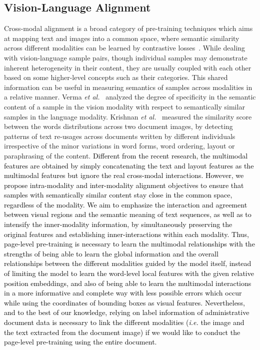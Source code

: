 \documentclass[preprint,review,12pt]{elsarticle}
\newcommand{\etal}{\textit{et al.}}
\newcommand{\ie}{\textit{i.e. }}
\begin{document}
\subsection{Vision-Language Alignment}
Cross-modal alignment is a broad category of pre-training techniques which aims at mapping text and images into a common space, where semantic similarity across different modalities can be learned by contrastive losses~\cite{yuan2021multimodal, lu2019vilbert, NEURIPS2020_13f320e7}. While dealing with vision-language sample pairs, though individual samples may demonstrate inherent heterogeneity in their content, they are usually coupled with each other based on some higher-level concepts such as their categories. This shared information can be useful in measuring semantics of samples across modalities in a relative manner. Verma \etal~\cite{verma2018cross} analyzed the degree of specificity in the semantic content of a sample in the vision modality with respect to semantically similar samples in the language modality. Krishnan \etal~\cite{krishnan2016matching} measured the similarity score between the words distributions across two document images, by detecting patterns of text re-usages across documents written by different individuals irrespective of the minor variations in word forms, word ordering, layout or paraphrasing of the content. \textcolor{black}{Different from the recent research, the multimodal features are obtained by simply concatenating the text and layout features as the multimodal features but ignore the real cross-modal interactions. However, we propose intra-modality and inter-modality alignment objectives to ensure that samples with semantically similar content stay close in the common space, regardless of the modality. We aim to emphasize the interaction and agreement between visual regions and the semantic meaning of text sequences, as well as to intensify the inner-modality information, by simultaneously preserving the original features and establishing inner-interactions within each modality. Thus, page-level pre-training is necessary to learn the multimodal relationships with the strengths of being able to learn the global information and the overall relationships between the different modalities guided by the model itself, instead of limiting the model to learn the word-level local features with the given relative position embeddings, and also of being able to learn the multimodal interactions in a more informative and complete way with less possible errors which occur while using the coordinates of bounding boxes as visual features. Nevertheless, and to the best of our knowledge, relying on label information of administrative document data is necessary to link the different modalities (\ie the image and the text extracted from the document image) if we would like to conduct the page-level pre-training using the entire document.}
\end{document}
